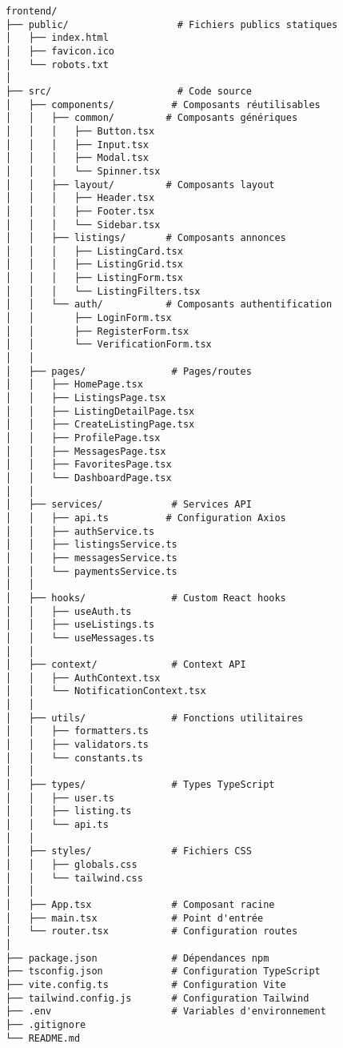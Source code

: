 \begin{lstlisting}[caption=Structure du projet frontend]
frontend/
├── public/                   # Fichiers publics statiques
│   ├── index.html
│   ├── favicon.ico
│   └── robots.txt
│
├── src/                      # Code source
│   ├── components/          # Composants réutilisables
│   │   ├── common/         # Composants génériques
│   │   │   ├── Button.tsx
│   │   │   ├── Input.tsx
│   │   │   ├── Modal.tsx
│   │   │   └── Spinner.tsx
│   │   ├── layout/         # Composants layout
│   │   │   ├── Header.tsx
│   │   │   ├── Footer.tsx
│   │   │   └── Sidebar.tsx
│   │   ├── listings/       # Composants annonces
│   │   │   ├── ListingCard.tsx
│   │   │   ├── ListingGrid.tsx
│   │   │   ├── ListingForm.tsx
│   │   │   └── ListingFilters.tsx
│   │   └── auth/           # Composants authentification
│   │       ├── LoginForm.tsx
│   │       ├── RegisterForm.tsx
│   │       └── VerificationForm.tsx
│   │
│   ├── pages/               # Pages/routes
│   │   ├── HomePage.tsx
│   │   ├── ListingsPage.tsx
│   │   ├── ListingDetailPage.tsx
│   │   ├── CreateListingPage.tsx
│   │   ├── ProfilePage.tsx
│   │   ├── MessagesPage.tsx
│   │   ├── FavoritesPage.tsx
│   │   └── DashboardPage.tsx
│   │
│   ├── services/            # Services API
│   │   ├── api.ts          # Configuration Axios
│   │   ├── authService.ts
│   │   ├── listingsService.ts
│   │   ├── messagesService.ts
│   │   └── paymentsService.ts
│   │
│   ├── hooks/               # Custom React hooks
│   │   ├── useAuth.ts
│   │   ├── useListings.ts
│   │   └── useMessages.ts
│   │
│   ├── context/             # Context API
│   │   ├── AuthContext.tsx
│   │   └── NotificationContext.tsx
│   │
│   ├── utils/               # Fonctions utilitaires
│   │   ├── formatters.ts
│   │   ├── validators.ts
│   │   └── constants.ts
│   │
│   ├── types/               # Types TypeScript
│   │   ├── user.ts
│   │   ├── listing.ts
│   │   └── api.ts
│   │
│   ├── styles/              # Fichiers CSS
│   │   ├── globals.css
│   │   └── tailwind.css
│   │
│   ├── App.tsx              # Composant racine
│   ├── main.tsx             # Point d'entrée
│   └── router.tsx           # Configuration routes
│
├── package.json             # Dépendances npm
├── tsconfig.json            # Configuration TypeScript
├── vite.config.ts           # Configuration Vite
├── tailwind.config.js       # Configuration Tailwind
├── .env                     # Variables d'environnement
├── .gitignore
└── README.md
\end{lstlisting}

